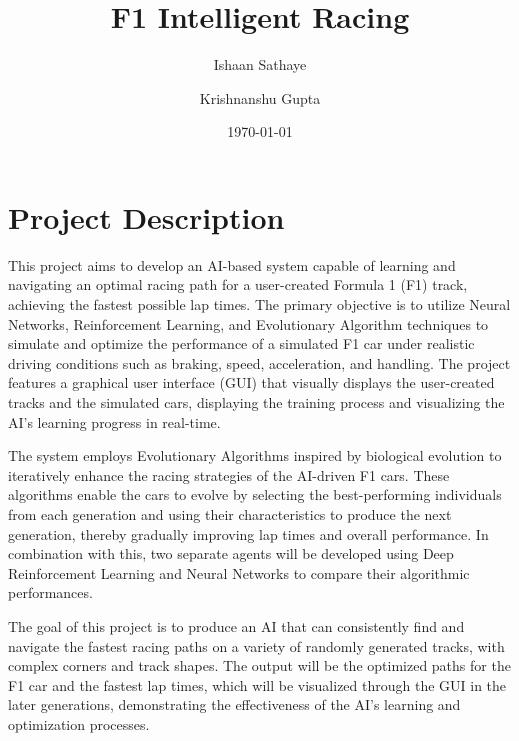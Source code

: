 \documentclass[12pt]{article}
\begin{document}
\title{F1 Intelligent Racing}

\author{%
   Ishaan Sathaye%
   \and%
   Krishnanshu Gupta%
}

\date{\today}

\maketitle



\section{Project Description}

This project aims to develop an AI-based system capable of learning and 
navigating an optimal racing path for a user-created Formula 1 (F1) track, 
achieving the fastest possible lap times. The primary objective is to utilize 
Neural Networks, Reinforcement Learning, and Evolutionary Algorithm techniques 
to simulate and optimize the performance of a simulated F1 car under realistic 
driving conditions such as braking, speed, acceleration, and handling. The 
project features a graphical user interface (GUI) that visually displays the 
user-created tracks and the simulated cars, displaying the training process and 
visualizing the AI's learning progress in real-time.

The system employs Evolutionary  Algorithms inspired by biological evolution to 
iteratively enhance the racing strategies of the AI-driven F1 cars. These 
algorithms enable the cars to evolve by selecting the best-performing 
individuals from each generation and using their characteristics to produce the 
next generation, thereby gradually improving lap times and overall performance. 
In combination with this, two separate agents will be developed using Deep 
Reinforcement Learning and Neural Networks to compare their algorithmic 
performances.

The goal of this project is to produce an AI that can consistently find and 
navigate the fastest racing paths on a variety of randomly generated tracks, 
with complex corners and track shapes. The output will be the optimized paths 
for the F1 car and the fastest lap times, which will be visualized through the 
GUI in the later generations, demonstrating the effectiveness of the AI's 
learning and optimization processes.
\end{document}
